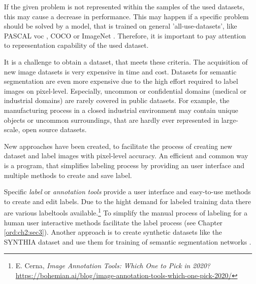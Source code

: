 \begin{itemize}
	If the given problem is not represented within the samples of the used datasets, this may cause a decrease in performance.
	This may happen if a specific problem should be solved by a model, that is trained on general 'all-use-datasets', like PASCAL \gls{voc} \cite{Eve20-PascalVOC}, COCO \cite{Lin14-Coco} or ImageNet \cite{Deng09-ImageNet}.
	Therefore, it is important to pay attention to representation capability of the used dataset.
\end{itemize} 
It is a challenge to obtain a dataset, that meets these criteria.
The acquisition of new image datasets is very expensive in time and cost.
Datasets for semantic segmentation are even more expensive due to the high effort required to label images on pixel-level.
Especially, uncommon or confidential domains (\eg medical or industrial domains) are rarely covered in public datasets.
For example, the manufacturing process in a closed industrial environment may contain unique objects or uncommon surroundings, that are hardly ever represented in large-scale, open source datasets.

New approaches have been created, to facilitate the process of creating new dataset and label images with pixel-level accuracy.
An efficient and common way is a program, that simplifies labeling process by providing an user interface and multiple methods to create and save label.

Specific \textit{label} or \textit{annotation tools} provide a user interface and easy-to-use methods to create and edit labels. 
Due to the hight demand for labeled training data there are various labeltools available.\footnote{E. Cerna, \textit{Image Annotation Tools: Which One to Pick in 2020?} \url{https://bohemian.ai/blog/image-annotation-tools-which-one-pick-2020/}}
To simplify the manual process of labeling for a human user interactive methods facilitate the label process (see Chapter \ref{ord:ch2:sec3}).
Another approach is to create synthetic datasets like the SYNTHIA dataset \cite{Zol19-Temporal} and use them for training of semantic segmentation networks \cite{Chen18-SyntheticData}.


